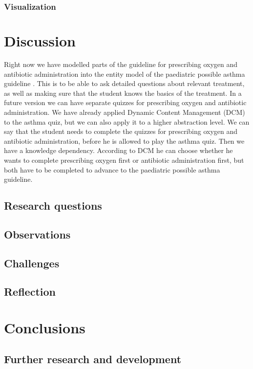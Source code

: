 \documentclass[a4paper,12pt]{book}
\begin{document}
\subsection{Visualization}




\chapter{Discussion}
Right now we have modelled parts of the guideline for prescribing oxygen \parencite{RepublicofKeny2016} and antibiotic administration \parencite{RepublicofKeny2016} into the entity model of the paediatric possible asthma guideline \parencite{RepublicofKeny2016}. This is to be able to ask detailed questions about relevant treatment, as well as making sure that the student knows the basics of the treatment. In a future version we can have separate quizzes for prescribing oxygen and antibiotic administration. We have already applied Dynamic Content Management (DCM) to the asthma quiz, but we can also apply it to a higher abstraction level. We can say that the student needs to complete the quizzes for prescribing oxygen and antibiotic administration, before he is allowed to play the asthma quiz. Then we have a knowledge dependency. According to DCM he can choose whether he wants to complete prescribing oxygen first or antibiotic administration first, but both have to be completed to advance to the paediatric possible asthma guideline.

\section{Research questions}

\section{Observations}
\section{Challenges}
\section{Reflection}



\chapter{Conclusions}
\section{Further research and development}
\end{document}
